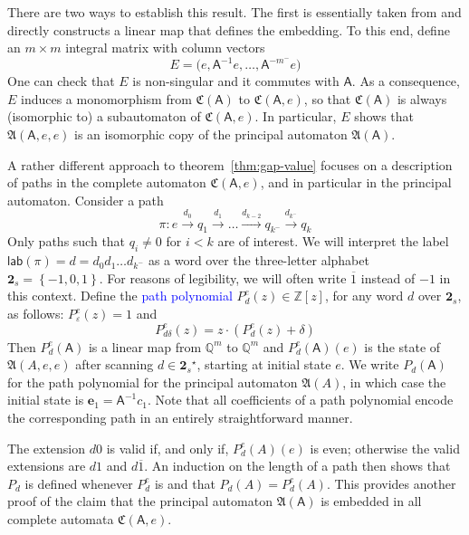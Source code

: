 \documentclass[12pt]{svmult}
\def\emph#1{\textcolor{blue}{#1}}
\let\eps=\varepsilon
\def\2{\mathbf{2}}
\def\pre#1{{#1}^{-}}
\def\Q{\mathbb{Q}}
\def\setof#1{\left\{ {#1} \right\}}
\def\Z{\mathbb{Z}}
\def\AA{\mathsf{A}}             %
\def\canaut{\fA}                %
\def\cmpaut{\fC}                %
\def\fA{\mathfrak{A}}
\def\fC{\mathfrak{C}}           %
\def\lab{\mathsf{lab}}          %
\def\ppol#1#2{P^{#1}_{#2}}      %
\def\trtm{\overline{1}}
\def\trtp{1}
\def\trtz{0}
\def\tsym{\2_{s}}               %
\def\unvo{\mathbf{e}_{1}}
\providecommand{\Star}[1]{{#1}^{\star}}
\begin{document}
There are two ways to establish this result. 
The first is essentially taken from \cite{Okano15:thesis} and directly 
constructs a linear map that defines the embedding. 
To this end, define an $m \times m$ integral matrix with column vectors 
%
\begin{equation}
  \label{eq:r-matrix}
  E = \bigl( e, \AA^{-1}e,  \ldots, \AA^{-\pre{m}}e ) 
\end{equation}
%
One can check that $E$ is non-singular and it commutes with $\AA$. 
As a consequence, $E$ induces a monomorphism from $\cmpaut(\AA)$ to $\cmpaut(\AA,e)$,  
so that  $\cmpaut(\AA)$ is always (isomorphic to) a subautomaton of $\cmpaut(\AA,e)$.
In particular, $E$ shows that $\fA(\AA,e,e)$ is an isomorphic copy of 
the principal automaton $\fA(\AA)$. 

A rather different approach to theorem~\ref{thm:gap-value} focuses on a description 
of paths in the complete automaton $\cmpaut(\AA,e)$, and in particular in the principal automaton. 
Consider a path 
%
\begin{equation}
  \label{eq:path}
    \pi : e \stackrel{d_{0}}{\longrightarrow} q_{1} \stackrel{d_{1}}{\longrightarrow} \ldots %
    \stackrel{d_{k-2}}{\longrightarrow} q_{\pre{k}} \stackrel{d_{\pre{k}}}{\longrightarrow} q_{k}
  \end{equation}
%
Only paths such that $q_{i} \neq 0$ for $i < k$ are of interest. 
We will interpret the label $\lab(\pi) = d = d_{0}d_{1} \ldots d_{\pre{k}}$ as a word over the three-letter 
alphabet $\tsym = \setof{-1,\trtz,\trtp}$.
For reasons of legibility, we will often write $\trtm$ instead of $-1$ in this context.
Define the 
\emph{path polynomial} $\ppol{e}{d}(z) \in \Z[z]$, for any word $d$ over $\tsym$,  
as follows:
%
$\ppol{e}{\eps}(z) = 1$ and  
%
\begin{equation} \label{eq:pathpol}
\ppol{e}{d \delta }(z)  = z \cdot ( \ppol{e}{d}(z) + \delta  )
\end{equation}
%
Then $\ppol{e}{d}(\AA)$ is a linear map from $\Q^{m}$ to $\Q^{m}$  and 
$\ppol{e}{d}(\AA)(e)$ is the state of $\fA(A,e,e)$ after scanning $d \in \Star{\tsym}$, 
starting at initial state $e$.
We write $\ppol{}{d}(\AA)$ for the path polynomial for the principal automaton 
$\canaut(A)$, in which case the initial state is $\unvo = \AA^{-1}c_{1}$. 
Note that all coefficients of a path polynomial encode the corresponding path in an 
entirely straightforward manner. 

The extension $d 0$ is valid if, and only if, $\ppol{e}{d}(A)(e)$ is even;
otherwise the valid extensions are $d\trtp$ and $d\trtm$. 
An induction on the length of a path then shows that $\ppol{}{d}$ is defined 
whenever $\ppol{e}{d}$ is and that $\ppol{}{d}(A) = \ppol{e}{d}(A)$.
This provides another proof of the claim that the principal automaton  $\fA(\AA)$ is 
embedded in all complete automata $\cmpaut(\AA,e)$.
\end{document}
